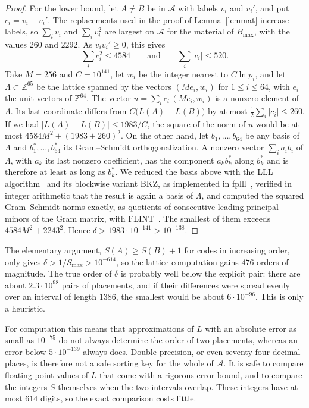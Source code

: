 \documentclass[12pt,reqno]{article}
\newcommand{\ZZ}{\mathbb{Z}}
\newcommand{\adm}{\mathcal{A}}
\begin{document}
\begin{proof}
For the lower bound, let $A\neq B$ be in $\adm$ with labels $v_i$ and $v_i'$, and put
$c_i=v_i-v_i'$. The replacements used in the proof of Lemma~\ref{lemmat} increase labels, so
$\sum_i v_i$ and $\sum_i v_i^2$ are largest on $\adm$ for the material of $B_{\max}$, with the
values $260$ and $2292$. As $v_iv_i'\geq 0$, this gives
\begin{displaymath}
\sum_i c_i^2\leq 4584\qquad\text{and}\qquad \sum_i |c_i|\leq 520 .
\end{displaymath}
Take $M=256$ and $C=10^{141}$, let $w_i$ be the integer nearest to $C\ln p_i$, and let
$\Lambda\subset\ZZ^{65}$ be the lattice spanned by the vectors $(Me_i,w_i)$ for $1\leq i\leq 64$,
with $e_i$ the unit vectors of $\ZZ^{64}$. The vector $u=\sum_i c_i\,(Me_i,w_i)$ is a nonzero
element of $\Lambda$. Its last coordinate differs from $C\bigl(L(A)-L(B)\bigr)$ by at most
$\frac12\sum_i|c_i|\leq 260$. If we had $|L(A)-L(B)|\leq 1983/C$, the square of the norm of $u$
would be at most $4584M^2+(1983+260)^2$. On the other hand, let $b_1,\ldots,b_{64}$ be any basis of
$\Lambda$ and $b_1^{\ast},\ldots,b_{64}^{\ast}$ its Gram--Schmidt orthogonalization. A nonzero
vector $\sum_i a_ib_i$ of $\Lambda$, with $a_k$ its last nonzero coefficient, has the component
$a_kb_k^{\ast}$ along $b_k^{\ast}$ and is therefore at least as long as $b_k^{\ast}$. We reduced the
basis above with the LLL algorithm~\cite{lll} and its blockwise variant BKZ, as implemented in
fplll~\cite{fplll}, verified in integer arithmetic that the result is again a basis
of $\Lambda$, and computed the squared Gram--Schmidt norms exactly, as quotients of consecutive
leading principal minors of the Gram matrix, with FLINT~\cite{flint}. The smallest of them
exceeds $4584M^2+2243^2$. Hence $\delta>1983\cdot 10^{-141}>10^{-138}$.
\end{proof}

The elementary argument, $S(A)\geq S(B)+1$ for codes in increasing order, only gives
$\delta>1/S_{\max}>10^{-614}$, so the lattice computation gains $476$ orders of magnitude. The
true order of $\delta$ is probably well below the explicit pair: there are about
$2.3\cdot 10^{98}$ pairs of placements, and if their differences were spread evenly over an
interval of length $1386$, the smallest would be about $6\cdot 10^{-96}$. This is only a heuristic.

For computation this means that approximations of $L$ with an absolute error
as small as $10^{-75}$ do not always determine the order of two placements, whereas an
error below $5\cdot 10^{-139}$ always does. Double precision, or even seventy-four decimal places, is
therefore not a safe sorting key for the whole of $\adm$. It is safe to compare floating-point
values of $L$ that come with a rigorous error bound, and to compare the integers $S$ themselves
when the two intervals overlap. These integers have at most $614$ digits, so the exact
comparison costs little.
\end{document}
